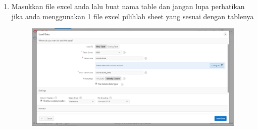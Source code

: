\documentclass[12pt, times new roman, a4paper]{article}
\begin{document}
\begin{enumerate}
\item Masukkan file excel anda lalu buat nama table dan jangan lupa perhatikan jika anda menggunakan 1 file excel pilihlah sheet yang sesuai dengan tablenya
\begin{figure} [h]
	\centering
		\includegraphics[scale=0.4]{gambar/5}
\end{figure}


\end{enumerate}
\end{document}
